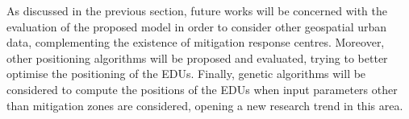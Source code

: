 \begin{refsection}
As discussed in the previous section, future works will be concerned with the evaluation of the proposed model in order to consider other geospatial urban data, complementing the existence of mitigation response centres. Moreover, other positioning algorithms will be proposed and evaluated, trying to better optimise the positioning of the EDUs. Finally, genetic algorithms will be considered to compute the positions of the EDUs when input parameters other than mitigation zones are considered, opening a new research trend in this area.



\printbibliography[heading=subbibliography]

\end{refsection}
